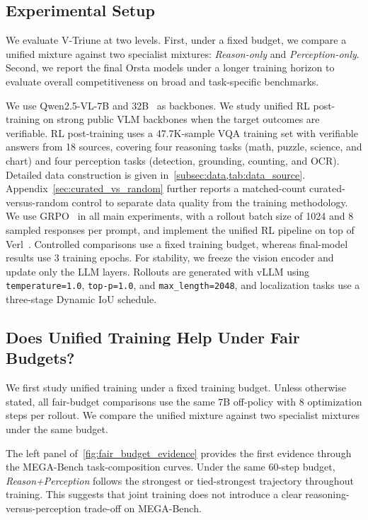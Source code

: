 \subsection{Experimental Setup}
\label{subsec:implementation details}

We evaluate V-Triune at two levels.
%
First, under a fixed budget, we compare a unified mixture against two specialist mixtures: \textit{Reason-only} and \textit{Perception-only}.
%
Second, we report the final Orsta models under a longer training horizon to evaluate overall competitiveness on broad and task-specific benchmarks.

We use Qwen2.5-VL-7B and 32B~\citep{Qwen2.5-VL} as backbones.
%
We study unified RL post-training on strong public VLM backbones when the target outcomes are verifiable.
%
RL post-training uses a 47.7K-sample VQA training set with verifiable answers from 18 sources, covering four reasoning tasks (math, puzzle, science, and chart) and four perception tasks (detection, grounding, counting, and OCR).
%
Detailed data construction is given in~\cref{subsec:data,tab:data_source}.
%
Appendix~\cref{sec:curated_vs_random} further reports a matched-count curated-versus-random control to separate data quality from the training methodology.
%
We use GRPO~\citep{shao2024deepseekmath} in all main experiments, with a rollout batch size of 1024 and 8 sampled responses per prompt, and implement the unified RL pipeline on top of Verl~\citep{sheng2024hybridflow}.
%
Controlled comparisons use a fixed training budget, whereas final-model results use 3 training epochs.
%
For stability, we freeze the vision encoder and update only the LLM layers.
%
Rollouts are generated with vLLM using \texttt{temperature=1.0}, \texttt{top-p=1.0}, and \texttt{max\_length=2048}, and localization tasks use a three-stage Dynamic IoU schedule.

\subsection{Does Unified Training Help Under Fair Budgets?}
\label{subsec:fair_budget}

We first study unified training under a fixed training budget.
%
Unless otherwise stated, all fair-budget comparisons use the same 7B off-policy with 8 optimization steps per rollout.
%
We compare the unified mixture against two specialist mixtures under the same budget.

The left panel of~\cref{fig:fair_budget_evidence} provides the first evidence through the MEGA-Bench task-composition curves.
%
Under the same 60-step budget, \textit{Reason+Perception} follows the strongest or tied-strongest trajectory throughout training.
%
This suggests that joint training does not introduce a clear reasoning-versus-perception trade-off on MEGA-Bench.

